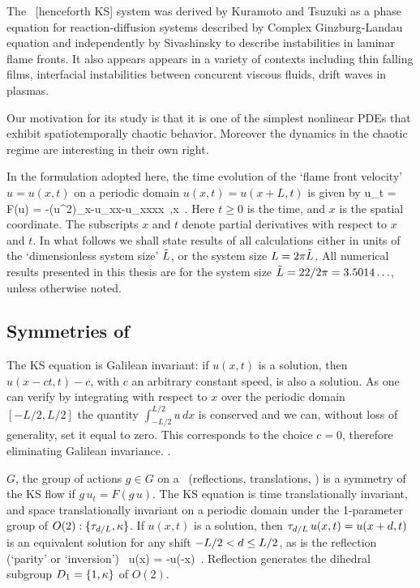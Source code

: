 
 
The \KS\ [henceforth KS] system was derived by Kuramoto and Tsuzuki as a phase equation for reaction-diffusion
systems described by Complex Ginzburg-Landau equation and independently by Sivashinsky to describe instabilities in laminar flame fronts.
It also appears appears in a variety of contexts including thin falling films, interfacial instabilities between concurent viscous fluids, drift waves in plasmas. 

Our motivation for its study is that it is one of the simplest nonlinear PDEs that
exhibit spatiotemporally chaotic behavior. Moreover the dynamics in the chaotic regime are
interesting in their own right.

 In the formulation
adopted here, the time evolution of the `flame front velocity'
$u=u(x,t)$ on a periodic domain $u(x,t) = u(x+L,t)$ is given by
\beq
  u_t = F(u) = -{\textstyle{}}(u^2)_x-u_{xx}-u_{xxxx}
    \,,\qquad   x \in [-L/2,L/2]
    \,.
Here $t \geq 0$ is the time, and $x$ is the spatial coordinate.
The subscripts $x$ and $t$ denote partial derivatives with respect to
$x$ and $t$. In what follows
we shall state results of all calculations either in units of the
`dimensionless system size' $\tilde{L}$, or the system size $L = 2 \pi
\tilde{L}$. All numerical results presented in this thesis
are for the system size $\tilde{L}=22/2\pi = 3.5014\ldots$, unless otherwise
noted.


\subsection{Symmetries of \KSe}
\label{sec:KSeSymm}

The KS equation is Galilean invariant: if $u(x,t)$ is a solution,
then $u(x -ct,t) -c $, with $c$ an arbitrary constant
speed, is also a solution. As one can verify by integrating  with 
respect to $x$ over the periodic domain $[-L/2,L/2]$ the quantity
 $\int_{-L/2}^{L/2} u\,dx$ 
is conserved and we can, without loss of generality, set it equal to zero. This corresponds
to the choice $c=0$, therefore eliminating Galilean invariance.
.

$G$, the group of actions $ g \in G $ on a
\statesp\ (reflections, translations, \etc) is a symmetry of the KS
flow  if $g\,u_t = F(g\,u)$.
The KS equation is time translationally invariant, and space translationally invariant
on a periodic domain under
the 1-parameter group of
$O(2): \{\tau_{d/L},\kappa \}$.
If $u(x,t)$ is a solution, then
$\tau_{d/L}\, u(x,t) = u(x+d,t)$
is an equivalent solution for any shift
$-L/2 < d \leq L/2$,
as is the
reflection (`parity' or `inversion')
\beq
    \Refl \, u(x) = -u(-x)
\,.
Reflection generates the dihedral subgroup $D_1 = \{1, \kappa\}$
of $O(2)$. 


